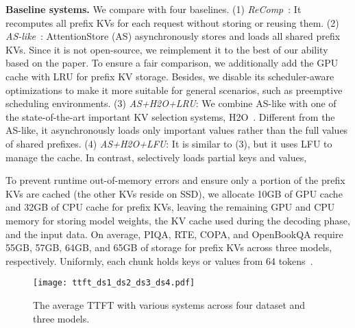 \noindent \textbf{Baseline systems.}
We compare \pname{} with four baselines.
(1) \textit{ReComp}~\cite{alluneed-nips17}: It recomputes all prefix KVs for each request without storing or reusing them.
(2) \textit{AS-like}~\cite{attentionstore-atc24}: AttentionStore (AS)
asynchronously stores and loads all shared prefix KVs. Since it is not
open-source, we reimplement it to the best of our ability based on the paper. To
ensure a fair comparison, we additionally add the GPU cache with LRU for prefix KV
storage. Besides, we disable its scheduler-aware optimizations to make it more
suitable for general scenarios, such as preemptive scheduling environments.
(3) \textit{AS+H2O+LRU}: We combine AS-like with one of the state-of-the-art important KV selection systems, H2O~\cite{h2o-nips23}. Different from the AS-like, it asynchronously loads only important values rather than the full values of shared prefixes.
(4) \textit{AS+H2O+LFU}: It is similar to (3), but it uses LFU to manage the cache.
In contrast, \pname{} selectively loads partial keys and values, 


To prevent runtime out-of-memory errors and ensure only a portion of the prefix
KVs are cached (the other KVs reside on SSD), we allocate 10GB of GPU cache and 32GB of CPU cache for prefix
KVs, leaving the remaining GPU and CPU memory for storing model weights, the KV cache
used during the decoding phase, and the input data.
On average, PIQA, RTE, COPA, and OpenBookQA require 55GB, 57GB, 64GB, and 65GB of storage for prefix KVs across three models, respectively. Uniformly, each chunk holds keys or values from 64 tokens~\cite{chunkattention-arxiv24}. 

\begin{figure*}
	\texttt{[image: ttft\_ds1\_ds2\_ds3\_ds4.pdf]}
	\vspace{-0.2in}
	\caption{
		The average TTFT with various systems across four dataset and three models.}
	\label{fig:overall_ttft}
	\vspace{-0.1in}
\end{figure*}